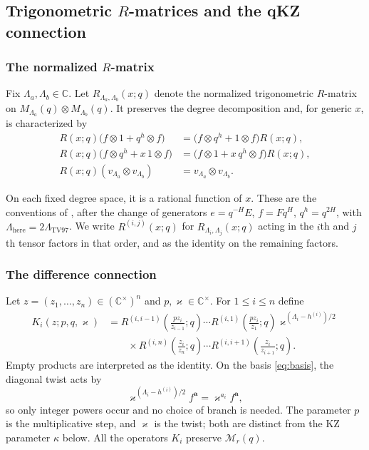 \documentclass[12pt]{amsart}
\theoremstyle{definition}
\numberwithin{equation}{section}
\theoremstyle{definition}
\let\mc\mathcal
\let\ka\kappa
\let\La\Lambda
\let\ox\otimes
\let\le\leqslant
\def\C{{\mathbb C}}
\begin{document}
\begin{samepage}
\subsection{Trigonometric \texorpdfstring{$R$}{R}-matrices and the qKZ connection}\label{sec:qkz}

\subsubsection{The normalized \texorpdfstring{$R$}{R}-matrix}

Fix $\La_a,\La_b\in\C$.  Let $R_{\La_a,\La_b}(x;q)$
denote the normalized trigonometric $R$-matrix on
$M_{\La_a}(q)\ox M_{\La_b}(q)$.  It preserves the degree
decomposition and, for generic $x$, is characterized by
\begin{align}
 R(x;q)\bigl(f\ox1+q^h\ox f\bigr)
   &=\bigl(f\ox q^h+1\ox f\bigr)R(x;q),\label{eq:R1}\\
 R(x;q)\bigl(f\ox q^h+x\,1\ox f\bigr)
   &=\bigl(f\ox1+x\,q^h\ox f\bigr)R(x;q),\label{eq:R2}\\
 R(x;q)(v_{\La_a}\ox v_{\La_b})
   &=v_{\La_a}\ox v_{\La_b}.\label{eq:R3}
\end{align}
\end{samepage}
On each fixed degree space, it is a rational function of $x$.
These are the conventions of \cite[Section~3, (3.3)--(3.4)]{TV97},
after the change of generators
$e=q^{-H}E$, $f=Fq^H$, $q^h=q^{2H}$, with
$\La_{\mathrm{here}}=2\La_{\mathrm{TV97}}$.
We write $R^{(i,j)}(x;q)$ for $R_{\La_i,\La_j}(x;q)$
acting in the $i$th and $j$th tensor factors in that order,
and as the identity on the remaining factors.

\subsubsection{The difference connection}

Let $z=(z_1,\ldots,z_n)\in(\C^\times)^n$ and
$p,\varkappa\in\C^\times$.  For $1\le i\le n$ define
\begin{align}
 K_i(z;p,q,\varkappa)
 &=R^{(i,i-1)}\!\left(\frac{p z_i}{z_{i-1}};q\right)
   \cdots R^{(i,1)}\!\left(\frac{p z_i}{z_1};q\right)
   \varkappa^{(\La_i-h^{(i)})/2}\nonumber\\[-2pt]
 &\qquad\times
   R^{(i,n)}\!\left(\frac{z_i}{z_n};q\right)
   \cdots R^{(i,i+1)}\!\left(\frac{z_i}{z_{i+1}};q\right).
 \label{eq:K}
\end{align}
Empty products are interpreted as the identity.
On the basis \eqref{eq:basis}, the diagonal twist acts by
\[
 \varkappa^{(\La_i-h^{(i)})/2}f^{\mathbf a}
 =\varkappa^{a_i}f^{\mathbf a},
\]
so only integer powers occur and no choice of branch is needed.
The parameter $p$ is the multiplicative step, and $\varkappa$ is
the twist; both are distinct from the KZ parameter $\ka$ below.
All the operators $K_i$ preserve $\mc M_r(q)$.
\end{document}
